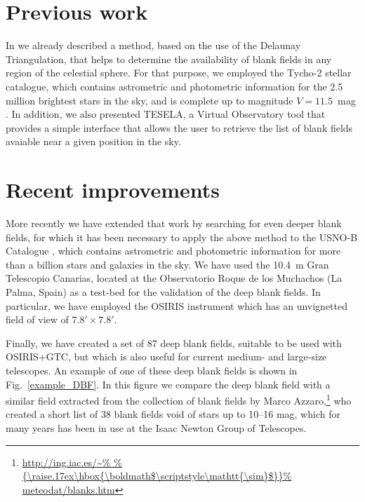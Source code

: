 \section{Previous work}

In \citet[][hereafter paper~I]{2011MNRAS.417.3061C} \citep[see also
contribution in previous ADASS~2011:][]{2012ASPC..461..173C} we already
described a method, based on the use of the Delaunay Triangulation, that helps
to determine the availability of blank fields in any region of the celestial
sphere. For that purpose, we employed the Tycho-2 stellar catalogue, which
contains astrometric and photometric information for the 2.5 million brightest
stars in the sky, and is complete up to magnitude $V=11.5$~mag
\citep{1997A&A...323L..49P}. In addition, we also presented TESELA, a Virtual
Observatory tool that provides a simple interface that allows the user to
retrieve the list of blank fields avaiable near a given position in the sky.

\section{Recent improvements}

More recently \citep[][hereafter paper~II]{2012arXiv1209.4861J} we have
extended that work by searching for even deeper blank fields, for which it has
been necessary to apply the above method to the USNO-B Catalogue
\citep{2003AJ....125..984M}, which contains astrometric and photometric
information for more than a billion stars and galaxies in the sky. We have used
the 10.4~m Gran Telescopio Canarias, located at the Observatorio Roque de los
Muchachos (La Palma, Spain) as a test-bed for the validation of the deep blank
fields. In particular, we have employed the OSIRIS instrument
\citep{2000SPIE.4008..623C} which has an unvignetted field of view of $7.8'
\times 7.8'$. 

Finally, we have created a set of 87 deep blank fields, suitable
to be used with OSIRIS+GTC, but which is also useful for current medium- and
large-size telescopes. An example of one of these deep blank fields is shown in
Fig.~\ref{example_DBF}. In this figure we compare the deep blank field with a
similar field extracted from the collection of blank fields by Marco
Azzaro,\footnote{\url{http://ing.iac.es/~%
meteodat/blanks.htm}}
who created a short list of 38 blank fields void of stars up to 10--16 mag,
which for many years has been in use at the Isaac Newton Group of Telescopes.


